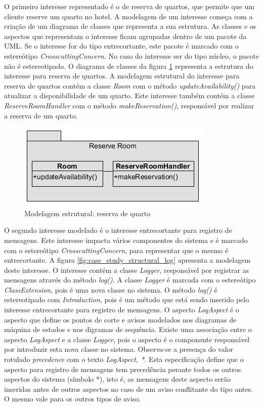 O primeiro interesse representado é o de reserva de quartos, que permite que um cliente reserve um quarto no hotel. A modelagem de um interesse começa 
com a criação de um diagrama de classes que representa a sua estrutura. As classes e os aspectos que representam o interesse ficam agrupadas dentro de
um pacote da UML. Se o interesse for do tipo entrecortante, este pacote é marcado com o estereótipo \textit{CrosscuttingConcern}. No caso do interesse 
ser do tipo núcleo, o pacote não é estereotipado. O diagrama de classes da figura \ref{fig:case_study_structural_reserve_room} representa a estrutura
do interesse para reserva de quartos. A modelagem estrutural do interesse para reserva de quartos contém a classe \textit{Room} com o método
\textit{updateAvailability()} para atualizar a disponibilidade de um quarto. Este interesse também contém a classe \textit{ReserveRoomHandler} com o 
método \textit{makeReservation()}, responsável por realizar a reserva de um quarto.

  \begin{figure}[!h]
	\centering
	\includegraphics{img/case_study_structural_reserve_room.png}
	\caption{Modelagem estrutural: reserva de quarto}\label{fig:case_study_structural_reserve_room}
  \end{figure}

O segundo interesse modelado é o interesse entrecortante para registro de mensagens. Este interesse impacta vários componentes do sistema e é
marcado com o estereótipo \textit{CrosscuttingConcern}, para representar que o mesmo é entrecortante. A figura \ref{fig:case_study_structural_log}
apresenta a modelagem deste interesse. O interesse contém a classe \textit{Logger}, responsável por registrar as mensagens através do método
\textit{log()}. A classe \textit{Logger} é marcada com o estereótipo \textit{ClassExtension}, pois é uma nova classe no sistema. O método
\textit{log()} é estereotipado com \textit{Introduction}, pois é um método que está sendo inserido pelo interesse entrecortante para registro de mensagens. 
O aspecto \textit{LogAspect} é o aspecto que define os pontos de corte e avisos modelados nos diagramas de máquina de estados e nos digramas de
sequência. Existe uma associação entre o aspecto \textit{LogAspect} e a classe \textit{Logger}, pois o aspecto é o componente responsável por introduzir esta 
nova classe no sistema. Observa-se a presença do valor rotulado \textit{precedence} com o texto \textit{LogAspect, *}. Esta especificação define que o
aspecto para registro de mensagens tem precedência perante todos os outros aspectos do sistema (símbolo *), isto é, as mensagens deste aspecto serão
inseridas antes de outros aspectos no caso de um aviso conflitante do tipo antes. O mesmo vale para os outros tipos de aviso.

